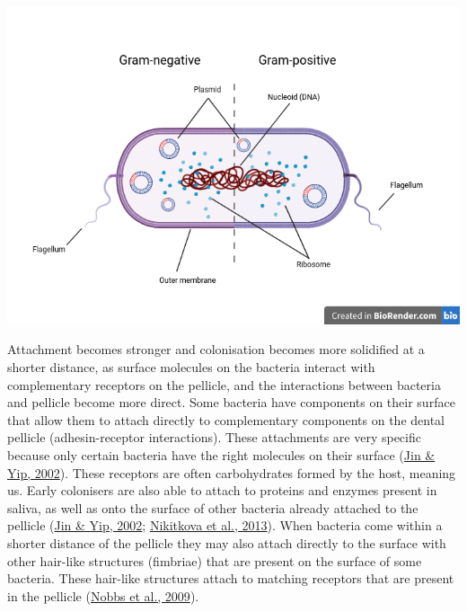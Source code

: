 \documentclass[
  letterpaper,
]{book}
\begin{document}
\includegraphics{figures/bacterial-structure.png}

Attachment becomes stronger and colonisation becomes more solidified at
a shorter distance, as surface molecules on the bacteria interact with
complementary receptors on the pellicle, and the interactions between
bacteria and pellicle become more direct. Some bacteria have components
on their surface that allow them to attach directly to complementary
components on the dental pellicle (adhesin-receptor interactions). These
attachments are very specific because only certain bacteria have the
right molecules on their surface
(\protect\hyperlink{ref-jinSupragingivalCalculus2002}{Jin \& Yip,
2002}). These receptors are often carbohydrates formed by the host,
meaning us. Early colonisers are also able to attach to proteins and
enzymes present in saliva, as well as onto the surface of other bacteria
already attached to the pellicle
(\protect\hyperlink{ref-jinSupragingivalCalculus2002}{Jin \& Yip, 2002};
\protect\hyperlink{ref-nikitkovaStarchBiofilms2013}{Nikitkova et al.,
2013}). When bacteria come within a shorter distance of the pellicle
they may also attach directly to the surface with other hair-like
structures (fimbriae) that are present on the surface of some bacteria.
These hair-like structures attach to matching receptors that are present
in the pellicle
(\protect\hyperlink{ref-nobbsStreptococcusAdherence2009}{Nobbs et al.,
2009}).
\end{document}
